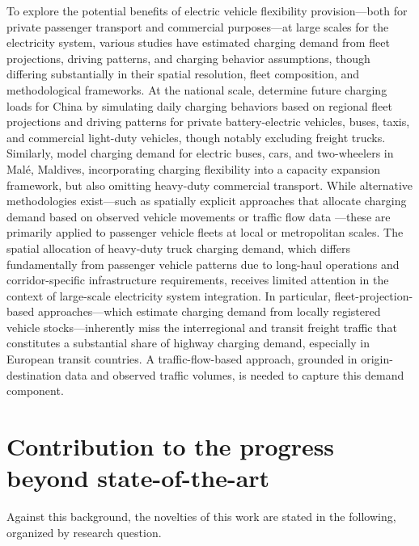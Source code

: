 To explore the potential benefits of electric vehicle flexibility provision—both for private passenger transport and commercial purposes—at large scales for the electricity system, various studies have estimated charging demand from fleet projections, driving patterns, and charging behavior assumptions, though differing substantially in their spatial resolution, fleet composition, and methodological frameworks. At the national scale, \citet{LI2021111962} determine future charging loads for China by simulating daily charging behaviors based on regional fleet projections and driving patterns for private battery-electric vehicles, buses, taxis, and commercial light-duty vehicles, though notably excluding freight trucks. Similarly, \citet{9530709} model charging demand for electric buses, cars, and two-wheelers in Malé, Maldives, incorporating charging flexibility into a capacity expansion framework, but also omitting heavy-duty commercial transport. While alternative methodologies exist—such as spatially explicit approaches that allocate charging demand based on observed vehicle movements \citep{10630833} or traffic flow data \citep{WANG2025135452}—these are primarily applied to passenger vehicle fleets at local or metropolitan scales. The spatial allocation of heavy-duty truck charging demand, which differs fundamentally from passenger vehicle patterns due to long-haul operations and corridor-specific infrastructure requirements, receives limited attention in the context of large-scale electricity system integration. In particular, fleet-projection-based approaches—which estimate charging demand from locally registered vehicle stocks—inherently miss the interregional and transit freight traffic that constitutes a substantial share of highway charging demand, especially in European transit countries. A traffic-flow-based approach, grounded in origin-destination data and observed traffic volumes, is needed to capture this demand component.

    \section{Contribution to the progress beyond state-of-the-art} \label{sec:contributions}

    Against this background, the novelties of this work are stated in the following, organized by research question.

